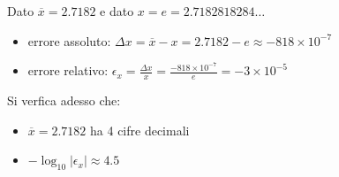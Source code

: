 Dato \(\overline{x} = 2.7182\) e dato \(x = e = 2.7182818284\ldots \)

\begin{itemize}

\item errore assoluto: \(\Delta x = \overline{x} - x = 2.7182 - e \approx - 818 \times 10^{-7}\)
\item errore relativo: \(\epsilon_x = \frac{\Delta x}{x} = \frac{- 818 \times 10^{-7}}{e} = - 3 \times 10^{-5}\)

\end{itemize}

\noindent Si verfica adesso che:

\begin{itemize}
\item \(\overline{x} = 2.7182\) ha 4 cifre decimali
\item \(- \log_{10}|\epsilon_x| \approx 4.5 \)
\end{itemize}
